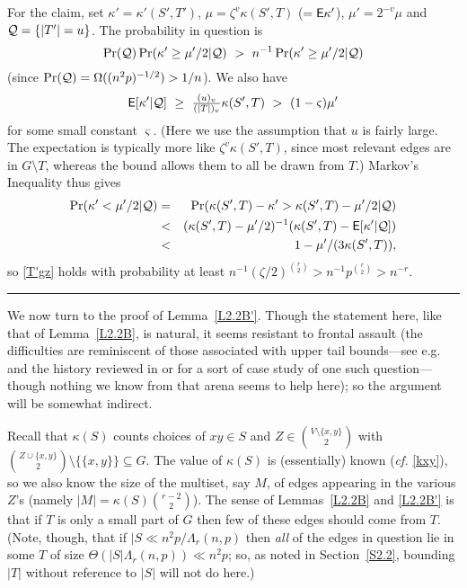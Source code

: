 \documentclass[letterpaper,11pt]{article}
\newcommand{\sub}[0]{\subseteq}
\newcommand{\sm}[0]{\setminus}
\newcommand{\Q}[0]{{\cal Q}}
\newcommand{\0}[0]{\emptyset}
\renewcommand{\qed}[0]{\begin{flushright} \rule{2mm}{3mm} \end{flushright}}
\newcommand{\C}[2]{{{#1}\choose{{#2}}}}
\newcommand{\gL}[0]{\Lambda}
\newcommand{\gO}[0]{\Omega}
\newcommand{\gz}[0]{\zeta}
\newcommand{\vs}[0]{\varsigma}
\newcommand{\glr}[0]{\gL_r(n,p)}
\begin{document}
For the claim,
set
$\kappa' =\kappa'(S',T')$,
$\mu =\gz^v\kappa (S',T)$ ($= {\sf E}\kappa' $),
$\mu'=2^{-v}\mu$
and $\Q =\{|T'|=u\}$.
The probability in question is
\[
\Pr(\Q )
\Pr(\kappa'\geq \mu'/2|
\Q ) ~>~ n^{-1}\Pr(\kappa'\geq \mu'/2|
\Q )
\]
(since $\Pr(\Q) =\gO((n^2p)^{-1/2})> 1/n$).
We also have
\[
\E[\kappa'|\Q ]~\geq ~\tfrac{(u)_v}{(|T|)_v}\kappa(S',T)~ > ~(1-\vs)\mu'
\]
for some small constant $\vs$.
(Here we use the assumption that $u$ is fairly large.
The expectation is typically more like $\gz^v\kappa(S',T)$, since most
relevant edges are in $G\sm T$,
whereas the bound allows them to all be drawn from $T$.)
Markov's Inequality thus gives
\begin{eqnarray*}
\Pr(\kappa'< \mu'/2|\Q ) &=&
\Pr(\kappa(S',T)-\kappa'> \kappa(S',T)-\mu'/2|\Q )\\
&<& (\kappa(S',T)-\mu'/2)^{-1}(\kappa(S',T)-\E[\kappa'|\Q ])\\
&<& 1-\mu'/(3\kappa(S',T)) ,
\end{eqnarray*}
so \eqref{T'gz} holds with probability
at least $n^{-1}(\gz/2)^{\C{r}{2}}>
n^{-1}p^{\C{r}{2}}> n^{-r}$.\qed




\medskip
We now turn to the proof of Lemma~\ref{L2.2B'}.
Though the statement here, like that of Lemma~\ref{L2.2B},
is natural,
it seems resistant to frontal assault
(the difficulties are reminiscent of those associated
with upper tail bounds---see e.g. \cite{Chat,DK1} and the
history reviewed in
\cite{IUT} or
\cite[Sec. 2.6]{JLR} for a sort of case study of one such question---though
nothing we know from that arena seems to help here);
so the argument will be
somewhat
indirect.


Recall that $\kappa(S) $ counts choices of $xy\in S$ and
$Z\in  \C{V\sm \{x,y\}}{2}$ with $\C{Z\cup\{x,y\}}{2}\sm \{\{x,y\}\}\sub G$.
The value of $\kappa(S)$ is (essentially) known ({\em cf.} \eqref{kxy}), so we
also know the size of the multiset, say $M$, of edges
appearing in the various $Z$'s (namely $|M|=\kappa(S)\C{r-2}{2}$).
The sense of
Lemmas~\ref{L2.2B} and \ref{L2.2B'} is that if $T$ is only a small part of $G$
then few of these edges should come from $T$.
%
(Note, though, that if $|S\ll n^2p/\glr$ then {\em all} of the edges in question
lie in some $T$ of size
$\Theta(|S|\glr)\ll n^2p$;
so, as noted in Section~\ref{S2.2}, bounding $|T|$ without reference to $|S|$ will not do here.)
\end{document}
